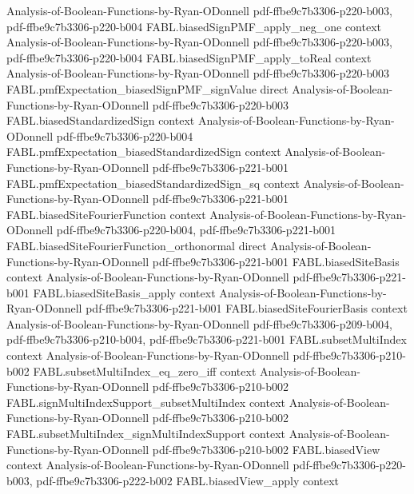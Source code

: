 \begin{theorem}
  {Analysis-of-Boolean-Functions-by-Ryan-ODonnell}
  {pdf-ffbe9c7b3306-p220-b003,
    pdf-ffbe9c7b3306-p220-b004}
\proofstep
  {FABL.biasedSignPMF_apply_neg_one}
  {context}
  {Analysis-of-Boolean-Functions-by-Ryan-ODonnell}
  {pdf-ffbe9c7b3306-p220-b003,
    pdf-ffbe9c7b3306-p220-b004}
\proofstep
  {FABL.biasedSignPMF_apply_toReal}
  {context}
  {Analysis-of-Boolean-Functions-by-Ryan-ODonnell}
  {pdf-ffbe9c7b3306-p220-b003}
\proofstep
  {FABL.pmfExpectation_biasedSignPMF_signValue}
  {direct}
  {Analysis-of-Boolean-Functions-by-Ryan-ODonnell}
  {pdf-ffbe9c7b3306-p220-b003}
\proofstep
  {FABL.biasedStandardizedSign}
  {context}
  {Analysis-of-Boolean-Functions-by-Ryan-ODonnell}
  {pdf-ffbe9c7b3306-p220-b004}
\proofstep
  {FABL.pmfExpectation_biasedStandardizedSign}
  {context}
  {Analysis-of-Boolean-Functions-by-Ryan-ODonnell}
  {pdf-ffbe9c7b3306-p221-b001}
\proofstep
  {FABL.pmfExpectation_biasedStandardizedSign_sq}
  {context}
  {Analysis-of-Boolean-Functions-by-Ryan-ODonnell}
  {pdf-ffbe9c7b3306-p221-b001}
\proofstep
  {FABL.biasedSiteFourierFunction}
  {context}
  {Analysis-of-Boolean-Functions-by-Ryan-ODonnell}
  {pdf-ffbe9c7b3306-p220-b004,
    pdf-ffbe9c7b3306-p221-b001}
\proofstep
  {FABL.biasedSiteFourierFunction_orthonormal}
  {direct}
  {Analysis-of-Boolean-Functions-by-Ryan-ODonnell}
  {pdf-ffbe9c7b3306-p221-b001}
\proofstep
  {FABL.biasedSiteBasis}
  {context}
  {Analysis-of-Boolean-Functions-by-Ryan-ODonnell}
  {pdf-ffbe9c7b3306-p221-b001}
\proofstep
  {FABL.biasedSiteBasis_apply}
  {context}
  {Analysis-of-Boolean-Functions-by-Ryan-ODonnell}
  {pdf-ffbe9c7b3306-p221-b001}
\proofstep
  {FABL.biasedSiteFourierBasis}
  {context}
  {Analysis-of-Boolean-Functions-by-Ryan-ODonnell}
  {pdf-ffbe9c7b3306-p209-b004,
    pdf-ffbe9c7b3306-p210-b004,
    pdf-ffbe9c7b3306-p221-b001}
\proofstep
  {FABL.subsetMultiIndex}
  {context}
  {Analysis-of-Boolean-Functions-by-Ryan-ODonnell}
  {pdf-ffbe9c7b3306-p210-b002}
\proofstep
  {FABL.subsetMultiIndex_eq_zero_iff}
  {context}
  {Analysis-of-Boolean-Functions-by-Ryan-ODonnell}
  {pdf-ffbe9c7b3306-p210-b002}
\proofstep
  {FABL.signMultiIndexSupport_subsetMultiIndex}
  {context}
  {Analysis-of-Boolean-Functions-by-Ryan-ODonnell}
  {pdf-ffbe9c7b3306-p210-b002}
\proofstep
  {FABL.subsetMultiIndex_signMultiIndexSupport}
  {context}
  {Analysis-of-Boolean-Functions-by-Ryan-ODonnell}
  {pdf-ffbe9c7b3306-p210-b002}
\proofstep
  {FABL.biasedView}
  {context}
  {Analysis-of-Boolean-Functions-by-Ryan-ODonnell}
  {pdf-ffbe9c7b3306-p220-b003,
    pdf-ffbe9c7b3306-p222-b002}
\proofstep
  {FABL.biasedView_apply}
  {context}

\end{theorem}
